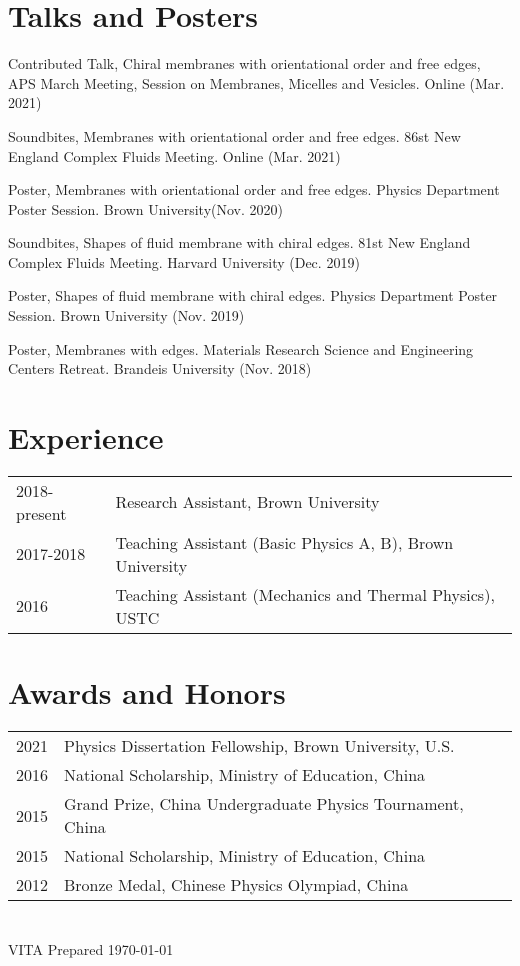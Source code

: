 \documentclass[11pt,letterpaper]{article}
\begin{document}
\section*{Talks and Posters}
\begin{etaremune}
    \item Contributed Talk, Chiral membranes with orientational order and free edges, APS March Meeting, Session on Membranes, Micelles and Vesicles. Online (Mar. 2021)
    \item Soundbites, Membranes with orientational order and free edges. 86st New England Complex Fluids Meeting. Online (Mar. 2021)
    \item Poster, Membranes with orientational order and free edges. Physics Department Poster Session. Brown University(Nov. 2020)
    \item Soundbites, Shapes of fluid membrane with chiral edges. 81st New England Complex Fluids Meeting. Harvard University (Dec. 2019)
    \item Poster, Shapes of fluid membrane with chiral edges. Physics Department Poster Session. Brown University (Nov. 2019)
    \item Poster, Membranes with edges. Materials Research Science and Engineering Centers Retreat. Brandeis University (Nov. 2018)
\end{etaremune}

\section*{Experience}
\vspace*{-0.15in}
\begin{longtable}{l p{\linewidth}}
    2018-present & Research Assistant, Brown University                      \\
    2017-2018    & Teaching Assistant (Basic Physics A, B), Brown University \\
    2016         & Teaching Assistant (Mechanics and Thermal Physics), USTC
\end{longtable}

\section*{Awards and Honors}
\vspace*{-0.15in}
\begin{longtable}{l p{\linewidth}}
    2021 & Physics Dissertation Fellowship, Brown University, U.S.    \\
    2016 & National Scholarship, Ministry of Education, China         \\
    2015 & Grand Prize, China Undergraduate Physics Tournament, China \\
    2015 & National Scholarship, Ministry of Education, China         \\
    2012 & Bronze Medal, Chinese Physics Olympiad, China
\end{longtable}

\section*{}
VITA Prepared \today
\end{document}
